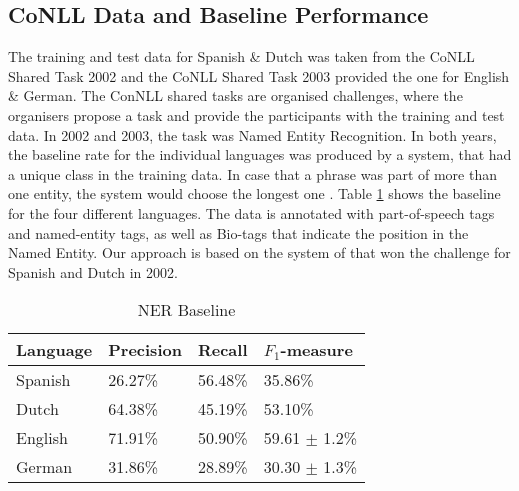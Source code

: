 \documentclass[11pt]{article}
\begin{document}
\subsection{CoNLL Data and Baseline Performance}
The training and test data for Spanish \& Dutch was taken from the CoNLL Shared Task 2002 \cite{tksintro} and 
the CoNLL Shared Task 2003 \cite{TjongKimSang:2003:ICS:1119176.1119195} provided the one for English \& German.
The ConNLL shared tasks are organised challenges, where the organisers propose a task and provide the participants with the
training and test data. 
In 2002 and 2003, the task was Named Entity Recognition. 
In both years, the baseline rate for the individual languages was produced by a system, that had a unique class in the training data. 
In case that a phrase was part of more than one entity, the system would choose the longest one \cite{TjongKimSang:2003:ICS:1119176.1119195}. 
Table \ref{table:Base} shows the baseline for the four different languages.  
The data is annotated with part-of-speech tags and named-entity tags, as well as Bio-tags that indicate the position in the Named Entity. %
Our approach is based on the system of \cite{strlearn} that won the challenge for Spanish and Dutch in 2002. 



\begin{table}[h!]
\scriptsize
\begin{tabular}{|l|l|l|l|}
\hline
\bf Language & \bf Precision & \bf Recall & \bf $F_1$-measure \\ \hline
Spanish &             26.27\% & 56.48\% & 35.86\%        \\
Dutch  &             64.38\%  &45.19\%    & 53.10\%  \\
English &              71.91\%& 50.90\%  & 59.61 $\pm$ 1.2\%\\
German &      31.86\%  & 28.89\% & 30.30  $\pm$ 1.3\% \\
\hline
\end{tabular}
\caption{NER Baseline}
\label{table:Base}
\end{table}
\end{document}
